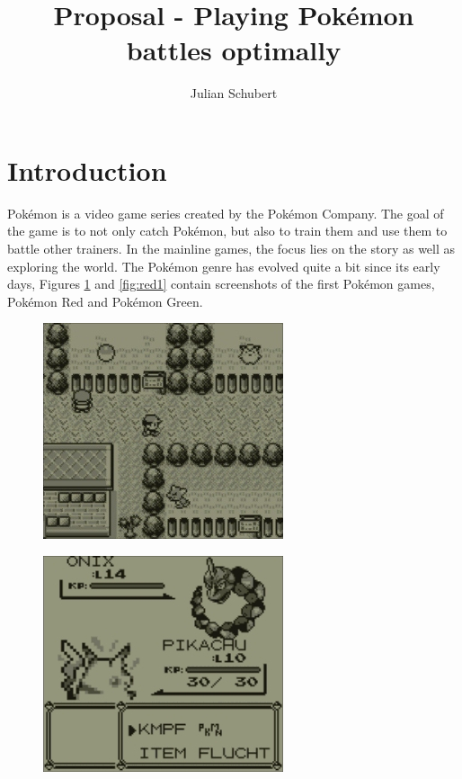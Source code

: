 \documentclass{article}
\title{Proposal - Playing Pokémon battles optimally}
\author{Julian Schubert}
\begin{document}
\maketitle

\section{Introduction}
Pokémon is a video game series created by the Pokémon Company.
The goal of the game is to not only catch Pokémon, but also to train them and use
them to battle other trainers. In the mainline games, the focus lies on the story
as well as exploring the world. The Pokémon genre has evolved quite a bit since
its early days, Figures \ref{fig:red0} and \ref{fig:red1} contain screenshots 
of the first Pokémon games, Pokémon Red and Pokémon Green.
\begin{figure}[ht]
    \centering
    \begin{minipage}{.5\textwidth}
      \centering
      \includegraphics[width=.9\linewidth]{images/Red-0.jpg}
      \label{fig:red0}
    \end{minipage}%
    \begin{minipage}{.5\textwidth}
      \centering
      \includegraphics[width=.9\linewidth]{images/Red-1.jpg}

\end{minipage}
\end{figure}
\end{document}
